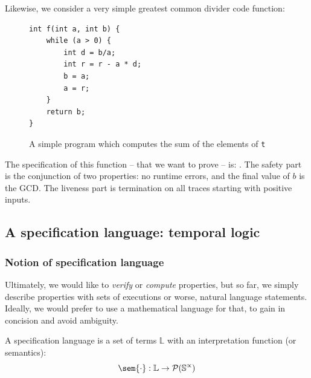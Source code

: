\documentclass[toc, titlepaged]{../cs-classes/cs-classes}
\begin{document}
\begin{example}
    Likewise, we consider a very simple greatest common divider code function:
    \begin{figure}[!ht]
        \centering 
        \begin{minipage}{0.2\textwidth}
            \begin{verbatim}
int f(int a, int b) {
    while (a > 0) {
        int d = b/a;
        int r = r - a * d;
        b = a;
        a = r;
    }
    return b;
}
            \end{verbatim}
        \end{minipage}
        \caption{A simple program which computes the sum of the elements of \texttt{t}}
    \end{figure}

    The specification of this function -- that we want to prove -- is: . The safety part is the conjunction of two properties: no runtime errors, and the final value of $b$ is the GCD. The liveness part is termination on all traces starting with positive inputs.
\end{example}

\subsection{A specification language: temporal logic}
\subsubsection{Notion of specification language}
Ultimately, we would like to \emph{verify} or \emph{compute} properties, but so far, we simply describe properties with sets of executions or worse, natural language statements. Ideally, we would prefer to use a mathematical language for that, to gain in concision and avoid ambiguity.

\begin{definition}
    A specification language is a set of terms $\mathbb{L}$ with an interpretation function (or semantics):
    \begin{equation*}
        \sem{\cdot} : \mathbb{L} \to \mathcal{P}(\S^\propto)
    \end{equation*}
\end{definition}
\end{document}

